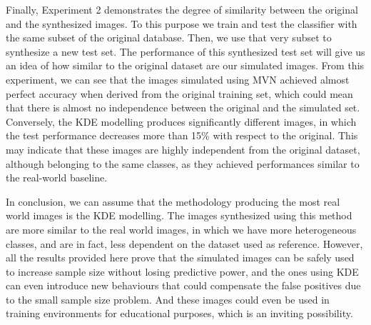 Finally, Experiment 2 demonstrates the degree of similarity between the original and the synthesized images. To this purpose we train and test the classifier with the same subset of the original database. Then, we use that very subset to synthesize a new test set. The performance of this synthesized test set will give us an idea of how similar to the original dataset are our simulated images. From this experiment, we can see that the images simulated using \ac{MVN} achieved almost perfect accuracy when derived from the original training set, which could mean that there is almost no independence between the original and the simulated set. Conversely, the \ac{KDE} modelling produces significantly different images, in which the test performance decreases more than 15\% with respect to the original. This may indicate that these images are highly independent from the original dataset, although belonging to the same classes, as they achieved performances similar to the real-world baseline. 

In conclusion, we can assume that the methodology producing the most real world images is the \ac{KDE} modelling. The images synthesized using this method are more similar to the real world images, in which we have more heterogeneous classes, and are in fact, less dependent on the dataset used as reference. However, all the results provided here prove that the simulated images can be safely used to increase sample size without losing predictive power, and the ones using \ac{KDE} can even introduce new behaviours that could compensate the false positives due to the small sample size problem. And these images could even be used in training environments for educational purposes, which is an inviting possibility. 